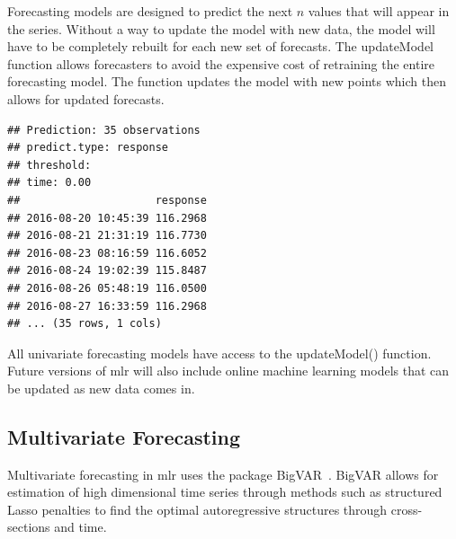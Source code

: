 \documentclass[12pt]{article}%
\makeatletter
\theoremstyle{definition}
\newcommand\code{\@codex}
\def\@codex#1{{\normalfont\ttfamily\hyphenchar\font=-1 #1}}
\newcommand{\pkg}[1]{{\fontseries{b}\selectfont #1}}
\makeatother
\begin{document}
 Forecasting models are designed to predict the next $n$ values that will appear in the series. Without a way to update the model with new data, the model will have to be completely rebuilt for each new set of forecasts. The \code{updateModel} function allows forecasters to avoid the expensive cost of retraining the entire forecasting model. The function updates the model with new points which then allows for updated forecasts.

\singlespacing
\begin{knitrout}
\color{fgcolor}\begin{kframe}
\begin{alltt}
 \hlkwb{=} 
                            
  
\end{alltt}
\begin{verbatim}
## Prediction: 35 observations
## predict.type: response
## threshold: 
## time: 0.00
##                     response
## 2016-08-20 10:45:39 116.2968
## 2016-08-21 21:31:19 116.7730
## 2016-08-23 08:16:59 116.6052
## 2016-08-24 19:02:39 115.8487
## 2016-08-26 05:48:19 116.0500
## 2016-08-27 16:33:59 116.2968
## ... (35 rows, 1 cols)
\end{verbatim}
\end{kframe}
\end{knitrout}
\doublespacing

All univariate forecasting models have access to the \code{updateModel()} function. Future versions of \code{mlr} will also include online machine learning models that can be updated as new data comes in.

\subsection{Multivariate Forecasting}
\label{seq:buildAndTuneMulti}

Multivariate forecasting in \pkg{mlr} uses the package \pkg{BigVAR}~\cite{bigvarpaper}. \pkg{BigVAR} allows for estimation of high dimensional time series through methods such as structured Lasso penalties to find the optimal autoregressive structures through cross-sections and time.

\singlespacing
\begin{knitrout}
\color{fgcolor}\begin{kframe}
\begin{alltt}
 \hlkwb{=} \hlstd{(}\hlstd{,} \hlstd{=} \hlstd{,}
                          \hlstd{=} \hlstd{,}
                          \hlstd{=} \hlstd{(}\hlstd{,} \hlstd{),} \hlstd{=} \hlstd{,}  \hlstd{=} \hlstd{)}
\end{alltt}
\end{kframe}
\end{knitrout}
\doublespacing
\end{document}
